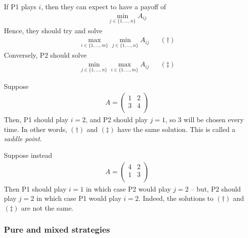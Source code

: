 \documentclass{../template/note}
\begin{document}
    If P1 plays $i$, then they can expect to have a payoff of
    \begin{align*}
        \min_{j \in \{1, \dots, n\}} A_{ij}
    \end{align*}
    Hence, they should try and solve
    \begin{align*}
        \max_{i \in \{1, \dots, m\}} \min_{j \in \{1, \dots, n\}} A_{ij} && (\dagger)
    \end{align*}
    Conversely, P2 should solve
    \begin{align*}
        \min_{j \in \{1, \dots, n\}} \max_{i \in \{1, \dots, m\}} A_{ij} && (\ddagger)
    \end{align*}
    
    \begin{example*}
        Suppose
        \begin{align*}
            A = \begin{pmatrix}
                1 & 2 \\
                3 & 4 \\
            \end{pmatrix}
        \end{align*}
        Then, P1 should play $i=2$, and P2 should play $j=1$, so 3 will be chosen every time. In other words, $(\dagger)$ and $(\ddagger)$ have the same solution. This is called a \emph{saddle point}.        
    \end{example*}
    
    \begin{example*}
        Suppose instead
        \begin{align*}
            A = \begin{pmatrix}
                4 & 2 \\
                1 & 3 \\
            \end{pmatrix}
        \end{align*}
        Then P1 should play $i=1$ in which case P2 would play $j=2$ -- but, P2 should play $j=2$ in which case P1 would play $i=2$. Indeed, the solutions to $(\dagger)$ and $(\ddagger)$ are not the same.        
    \end{example*}
    
    \subsubsection{Pure and mixed strategies}
\end{document}
